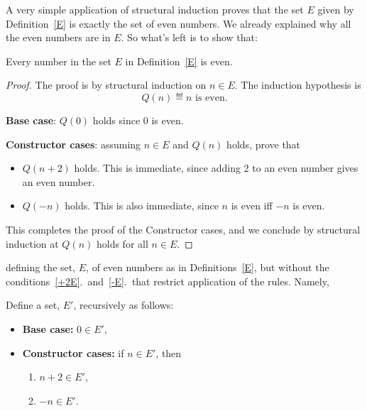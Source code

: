 \begin{definition}
\begin{staffnotes}
A very simple application of structural induction proves that the set $E$
given by Definition~\ref{E} is exactly the set of even numbers.  We already
explained why all the even numbers are in $E$.  So what's left is to show
that:

\begin{lemma*}
Every number in the set $E$ in Definition~\ref{E} is even.
\begin{proof}
The proof is by structural induction on $n \in E$.  The induction
hypothesis is 
\[
Q(n) \eqdef \text{$n$ is even}.
\]

\textbf{Base case}: $Q(0)$ holds since 0 is even.

\textbf{Constructor cases}: assuming $n \in E$ and $Q(n)$ holds, prove
that
\begin{itemize}

\item $Q(n+2)$ holds.  This is immediate, since adding 2 to an even number
  gives an even number.

\item $Q(-n)$ holds.  This is also immediate, since $n$ is even iff $-n$ is
even.

\end{itemize}

This completes the proof of the Constructor cases, and we conclude by
structural induction at $Q(n)$ holds for all $n \in E$.
\end{proof}

\end{lemma*}


defining the set, $E$, of even numbers as in Definitions~\ref{E}, but
without the conditions~\ref{+2E}.\ and~\ref{-E}.\ that restrict application of
the rules.  Namely,

\begin{definition}\label{Eamb}
Define a set, $E'$, recursively as follows:
\begin{itemize}
\item \textbf{Base case:} $0 \in E'$,\label{0Eamb}
\item \textbf{Constructor cases:} if $n \in E'$, then
\begin{enumerate}
\item $n+2 \in E'$, \label{+2Eamb}
\item $-n \in E'$.\label{-Eamb}
\end{enumerate}
\end{itemize}
\end{definition}


\end{staffnotes}
\end{definition}
